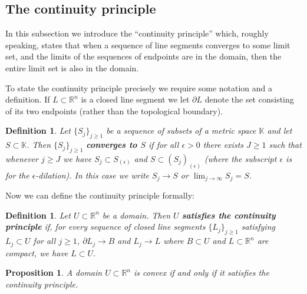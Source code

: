 \documentclass[11pt,a4paper, final, twoside]{article}
\newtheorem{definition}[theorem]{Definition}
\newtheorem{proposition}[theorem]{Proposition}
\numberwithin{equation}{section}
\newcommand{\R}{\mathbb R}
\newcommand{\RC}{\mathbb K}
\newcommand{\bd}{\partial}
\newcommand{\dil}[2]{#1_{(#2)}}
\begin{document}
\subsection{The continuity principle}
In this subsection we introduce the ``continuity principle'' which, roughly speaking, 
states that when a sequence of line segments converges to some limit set, and the limits of the sequences of endpoints are in the
domain, then the entire limit set is also in the domain. 

To state the continuity principle precisely we require some notation and a definition.
If $L\subset\R^n$ is a closed line segment we let $\bd L$ denote the set consisting of its two endpoints (rather than the topological boundary). 
\begin{definition}
Let $\{S_j\}_{j\geq 1}$ be a sequence of subsets of a metric space $\RC$ and let $S\subset \RC$. Then $\{S_j\}_{j\geq 1}$ \textbf{converges to $S$} if for all $\epsilon>0$ there exists
$J\geq 1$ such that whenever $j\geq J$ we have $S_j\subset \dil{S}{\epsilon}$ and $S\subset \dil{(S_j)}{\epsilon}$ (where the subscript $\epsilon$ is for the $\epsilon$-dilation). In
this case we write $S_j\to S$ or $\lim_{j\to\infty} S_j=S$.
\end{definition}
Now we can define the continuity principle formally:
\begin{definition}
Let $U\subset\R^n$ be a domain. Then $U$ \textbf{satisfies the continuity principle} if, for every sequence of closed line segments $\{L_j\}_{j\geq 1}$ satisfying $L_j\subset U$ for all $j\geq 1$,
$\bd L_j\to B$ and $L_j\to L$ where $B\subset U$ and $L\subset\R^n$ are compact, we have $L\subset U$.
\end{definition}
\begin{proposition}
A domain $U\subset\R^n$ is convex if and only if it satisfies the continuity principle.
\end{proposition}
\end{document}
